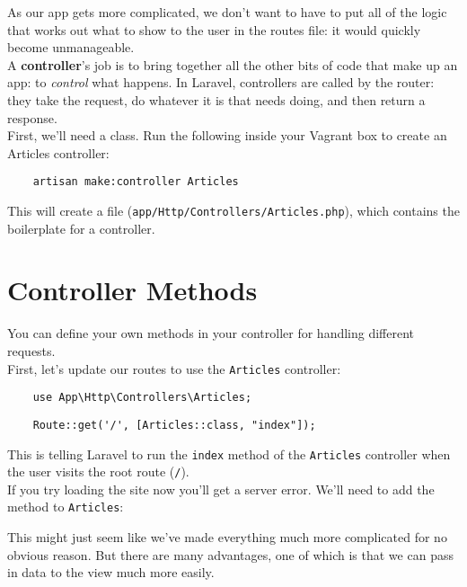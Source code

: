 As our app gets more complicated, we don't want to have to put all of the logic that works out what to show to the user in the routes file: it would quickly become unmanageable.
\\

A \textbf{controller}'s job is to bring together all the other bits of code that make up an app: to \textit{control} what happens. In Laravel, controllers are called by the router: they take the request, do whatever it is that needs doing, and then return a response.
\\

First, we'll need a class. Run the following inside your Vagrant box to create an Articles controller:

\begin{verbatim}
    artisan make:controller Articles
\end{verbatim}

This will create a file (\texttt{app/Http/Controllers/Articles.php}), which contains the boilerplate for a controller.

\section{Controller Methods}

You can define your own methods in your controller for handling different requests.
\\

First, let's update our routes to use the \texttt{Articles} controller:

\begin{verbatim}
    use App\Http\Controllers\Articles;
\end{verbatim}

\begin{verbatim}
    Route::get('/', [Articles::class, "index"]);
\end{verbatim}

This is telling Laravel to run the \texttt{index} method of the \texttt{Articles} controller when the user visits the root route (\texttt{/}).
\\

If you try loading the site now you'll get a server error. We'll need to add the method to \texttt{Articles}:


This might just seem like we've made everything much more complicated for no obvious reason. But there are many advantages, one of which is that we can pass in data to the view much more easily.
\\

